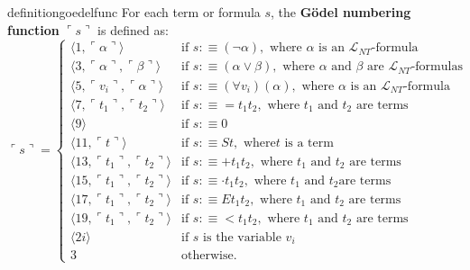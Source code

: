 \documentclass[11pt,letterpaper]{book}
\theoremstyle{definition}
\begin{document}
\begin{restatable}{definition}{goedelfunc}
\label{def:goedel_numbering_func}
For each term or formula $s$, the \textbf{G\"odel numbering function} $\ulcorner s \urcorner$ is defined as:
\begin{equation}
\ulcorner s \urcorner  =
\begin{cases}
\langle 1, \ulcorner \alpha \urcorner \rangle & \text{if } s :\equiv (\lnot
\alpha), \text{ where } \alpha \text{ is an } \mathcal{L}_{NT}
\text{-formula} \\
\langle 3, \ulcorner \alpha \urcorner, \ulcorner \beta \urcorner \rangle & \text{if }
s :\equiv(\alpha \lor \beta), \text{ where } \alpha \text{ and }
\beta \text{ are } \mathcal{L}_{NT} \text{-formulas} \\
\langle 5, \ulcorner v_i \urcorner, \ulcorner \alpha \urcorner \rangle & \text{if } s :\equiv (\forall v_i) (\alpha), \text{ where } \alpha \text{ is an }
\mathcal{L}_{NT} \text{-formula} \\
\langle 7, \ulcorner t_1 \urcorner, \ulcorner t_2 \urcorner \rangle & \text{if } s :\equiv =t_1 t_2, \text{ where } t_1 \text{ and } t_2 \text{ are
terms }\\
\langle 9 \rangle & \text{if } s :\equiv 0\\
\langle 11, \ulcorner t \urcorner \rangle & \text{if } s :\equiv S t, \text{ where
} t \text{ is a term }\\
\langle 13, \ulcorner t_1 \urcorner, \ulcorner t_2 \urcorner \rangle & \text{if } s :\equiv +t_1 t_2, \text{ where } t_1 \text{ and } t_2 \text{ are
terms }\\
\langle 15, \ulcorner t_1 \urcorner, \ulcorner t_2 \urcorner \rangle & \text{if } s :\equiv \cdot t_1 t_2, \text{ where } t_1 \text{ and } t_2 \text{
are terms }\\
\langle 17, \ulcorner t_1 \urcorner, \ulcorner t_2 \urcorner \rangle & \text{if } s :\equiv E t_1 t_2, \text{ where } t_1 \text{ and } t_2 \text{ are
terms }\\
\langle 19, \ulcorner t_1 \urcorner, \ulcorner t_2 \urcorner \rangle & \text{if } s :\equiv < t_1 t_2, \text{ where } t_1 \text{ and } t_2 \text{ are
terms }\\
\langle 2i \rangle & \text{if } s \text{ is the variable } v_i\\
3 & \text{otherwise}.
\end{cases}\nonumber
\end{equation}
\end{restatable}
\end{document}
